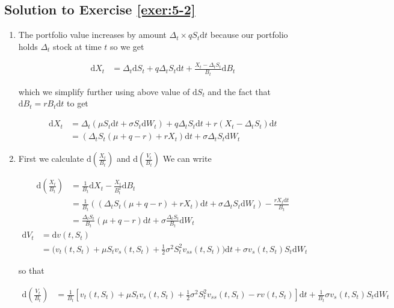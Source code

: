 \documentclass[12pt]{book}
\numberwithin{equation}{chapter}
\theoremstyle{plain}
\numberwithin{theorem}{section}
\theoremstyle{definition}
\numberwithin{exercise}{chapter}
\newcommand{\<}{\langle}
\renewcommand{\>}{\rangle}
\renewcommand{\(}{\left(}
\renewcommand{\)}{\right)}
\renewcommand{\[}{\left[}
\renewcommand{\]}{\right]}
\newcommand\dd{\mathrm{d}}
\theoremstyle{definition}
\numberwithin{question}{section}
\begin{document}
\subsection*{Solution to Exercise \ref{exer:5-2}}
\begin{enumerate}
    \item 
    
    The portfolio value increases by amount $\Delta_t \times q  S_t \dd t$ because our portfolio holds $\Delta_t$ stock at time $t$ so we get
    
    \begin{align*}
        \dd X_t & = \Delta_t \dd S_t + q \Delta_t S_t \dd t+ \frac{X_t - \Delta_t S_t}{B_t} \dd B_t
    \end{align*}
    
    which we simplify further using above value of $\dd S_t$ and the fact that $\dd B_t = r B_t \dd t$ to get
    
    \begin{align*}
        \dd X_t & = \Delta_t (\mu S_t \dd t + \sigma S_t \dd W_t) + q \Delta_t S_t \dd t + r(X_t - \Delta_t S_t) \dd t \\
        {} & = (\Delta_t S_t (\mu+q-r) + r X_t) \dd t + \sigma \Delta_t S_t \dd W_t
    \end{align*}
    
    \item First we calculate $\dd (\frac{X_t}{B_t})$ and $\dd (\frac{V_t}{B_t})$ We can write
    
    \begin{align*}
        \dd (\frac{X_t}{B_t}) & = \frac{1}{B_t} \dd X_t - \frac{X_t}{B^2_t} \dd B_t \\
        {} & = \frac{1}{B_t}((\Delta_t S_t (\mu+q-r) + r X_t) \dd t + \sigma \Delta_t S_t \dd W_t) - \frac{r X_t \dd t}{B_t} \\
        {} & = \frac{\Delta_t S_t}{B_t}(\mu+q-r) \dd t + \sigma \frac{\Delta_t S_t}{B_t} \dd W_t
    \end{align*}
    \begin{align*}
        \dd V_t & = \dd v(t,S_t) \\
        {} & = \Big( v_t(t,S_t) + \mu S_t v_s(t,S_t) + \frac{1}{2}\sigma^2 S^2_t v_{ss}(t,S_t) \Big) \dd t + \sigma v_s(t,S_t)  S_t \dd W_t
    \end{align*}
    
    so that
    
    \begin{align*}
        \dd (\frac{V_t}{B_t}) & = \frac{1}{B_t}[v_t(t,S_t) + \mu S_t v_s(t,S_t) + \frac{1}{2}\sigma^2 S^2_t v_{ss}(t,S_t)-rv(t,S_t)] \dd t + \frac{1}{B_t}\sigma v_s(t,S_t)  S_t \dd W_t
    \end{align*}
    

\end{enumerate}
\end{document}
